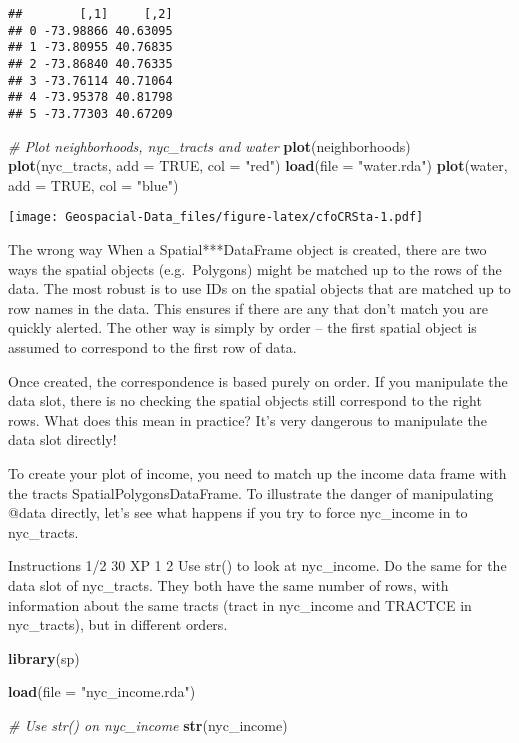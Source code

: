 \documentclass[]{article}
\newenvironment{Shaded}{\begin{snugshade}}{\end{snugshade}}
\newcommand{\CommentTok}[1]{\textcolor[rgb]{0.56,0.35,0.01}{\textit{#1}}}
\newcommand{\DataTypeTok}[1]{\textcolor[rgb]{0.13,0.29,0.53}{#1}}
\newcommand{\KeywordTok}[1]{\textcolor[rgb]{0.13,0.29,0.53}{\textbf{#1}}}
\newcommand{\NormalTok}[1]{#1}
\newcommand{\OtherTok}[1]{\textcolor[rgb]{0.56,0.35,0.01}{#1}}
\newcommand{\StringTok}[1]{\textcolor[rgb]{0.31,0.60,0.02}{#1}}
\begin{document}
\begin{verbatim}
##        [,1]     [,2]
## 0 -73.98866 40.63095
## 1 -73.80955 40.76835
## 2 -73.86840 40.76335
## 3 -73.76114 40.71064
## 4 -73.95378 40.81798
## 5 -73.77303 40.67209
\end{verbatim}

\begin{Shaded}
\begin{Highlighting}[]
\CommentTok{# Plot neighborhoods, nyc_tracts and water}
\KeywordTok{plot}\NormalTok{(neighborhoods)}
\KeywordTok{plot}\NormalTok{(nyc_tracts, }\DataTypeTok{add =} \OtherTok{TRUE}\NormalTok{, }\DataTypeTok{col =} \StringTok{"red"}\NormalTok{)}
\KeywordTok{load}\NormalTok{(}\DataTypeTok{file =} \StringTok{"water.rda"}\NormalTok{)}
\KeywordTok{plot}\NormalTok{(water, }\DataTypeTok{add =} \OtherTok{TRUE}\NormalTok{, }\DataTypeTok{col =} \StringTok{"blue"}\NormalTok{)}
\end{Highlighting}
\end{Shaded}

\texttt{[image: Geospacial-Data\_files/figure-latex/cfoCRSta-1.pdf]}

The wrong way When a Spatial***DataFrame object is created, there are
two ways the spatial objects (e.g.~Polygons) might be matched up to the
rows of the data. The most robust is to use IDs on the spatial objects
that are matched up to row names in the data. This ensures if there are
any that don't match you are quickly alerted. The other way is simply by
order -- the first spatial object is assumed to correspond to the first
row of data.

Once created, the correspondence is based purely on order. If you
manipulate the data slot, there is no checking the spatial objects still
correspond to the right rows. What does this mean in practice? It's very
dangerous to manipulate the data slot directly!

To create your plot of income, you need to match up the income data
frame with the tracts SpatialPolygonsDataFrame. To illustrate the danger
of manipulating @data directly, let's see what happens if you try to
force nyc\_income in to nyc\_tracts.

Instructions 1/2 30 XP 1 2 Use str() to look at nyc\_income. Do the same
for the data slot of nyc\_tracts. They both have the same number of
rows, with information about the same tracts (tract in nyc\_income and
TRACTCE in nyc\_tracts), but in different orders.

\begin{Shaded}
\begin{Highlighting}[]
\KeywordTok{library}\NormalTok{(sp)}

\KeywordTok{load}\NormalTok{(}\DataTypeTok{file =} \StringTok{"nyc_income.rda"}\NormalTok{)}

\CommentTok{# Use str() on nyc_income }
\KeywordTok{str}\NormalTok{(nyc_income)}
\end{Highlighting}
\end{Shaded}
\end{document}
